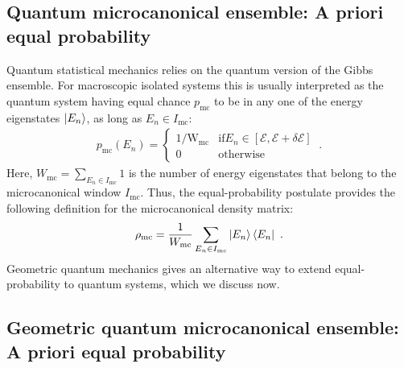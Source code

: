 \documentclass[draft,nofootinbib,pre,twocolumn,showpacs,showkeys,groupaddress,preprintnumbers,floatfix]{revtex4-1}
\newcommand{\1}{\mathbbm{1}}
\begin{document}
\subsection{Quantum microcanonical ensemble: A priori equal probability}

Quantum statistical mechanics relies on the quantum version of the Gibbs
ensemble. For macroscopic isolated systems this is usually interpreted as the
quantum system having equal chance $p_{\mathrm{mc}}$ to be in any one of the energy eigenstates $\ket{E_n}$, as long as $E_n \in I_{\mathrm{mc}}$:
\begin{align*}
p_{\mathrm{mc}}(E_n) = \begin{cases}
  1/{\mathrm{W_{\mathrm{mc}}}} & \mathrm{if} 
  E_n \in [\mathcal{E},\mathcal{E} + \delta \mathcal{E}] \\
  0 & \mathrm{otherwise}
  \end{cases}
  ~.
\end{align*}
Here, $W_{\mathrm{mc}} = \sum_{E_n \in I_\mathrm{mc}} 1$ is the number of
energy eigenstates that belong to the microcanonical window $I_{\mathrm{mc}}$.
Thus, the equal-probability postulate provides the following definition for
the microcanonical density matrix:
\begin{align*}
\rho_{\mathrm{mc}} = \frac{1}{W_{\mathrm{mc}}} \sum_{E_n \in I_{\mathrm{mc}}} \ket{E_n}\bra{E_n}
  ~.
\end{align*}
Geometric quantum mechanics gives an alternative way to extend
equal-probability to quantum systems, which we discuss now.

\subsection{Geometric quantum microcanonical ensemble: A priori equal probability}
\end{document}

